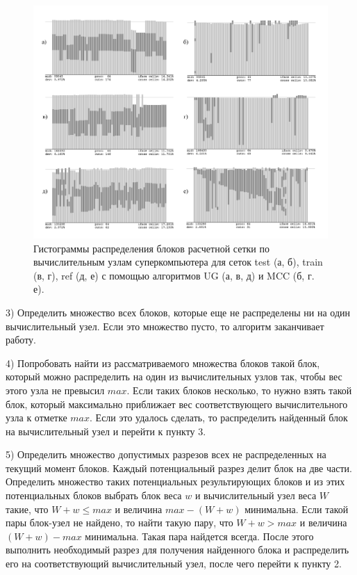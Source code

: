 \documentclass[a4paper,14pt]{extarticle}                     %
\theoremstyle{plain}                                         %
\begin{document}
\begin{figure}[!ht]
\centering
\includegraphics[width=1.0\textwidth]{./pics/text_2_withcut/2-merged-pic.pdf}
\singlespacing
{}\caption{Гистограммы распределения блоков расчетной сетки по вычислительным узлам суперкомпьютера для сеток test (а, б), train (в, г), ref (д, е) с помощью алгоритмов UG (а, в, д) и MCC (б, г. е).}
\label{fig:text_2_withcut_2_merged_pic}
\end{figure}

3) Определить множество всех блоков, которые еще не распределены ни на один вычислительный узел.
Если это множество пусто, то алгоритм заканчивает работу.

4) Попробовать найти из рассматриваемого множества блоков такой блок, который можно распределить на один из вычислительных узлов так, чтобы вес этого узла не превысил $max$.
Если таких блоков несколько, то нужно взять такой блок, который максимально приближает вес соответствующего вычислительного узла к отметке $max$.
Если это удалось сделать, то распределить найденный блок на вычислительный узел и перейти к пункту 3.

5) Определить множество допустимых разрезов всех не распределенных на текущий момент блоков.
Каждый потенциальный разрез делит блок на две части.
Определить множество таких потенциальных результирующих блоков и из этих потенциальных блоков выбрать блок веса $w$ и вычислительный узел веса $W$ такие, что $W + w \le max$ и величина $max - (W + w)$ минимальна.
Если такой пары блок-узел не найдено, то найти такую пару, что $W + w > max$ и величина $(W + w) - max$ минимальна.
Такая пара найдется всегда.
После этого выполнить необходимый разрез для получения найденного блока и распределить его на соответствующий вычислительный узел, после чего перейти к пункту 2.
\end{document}
